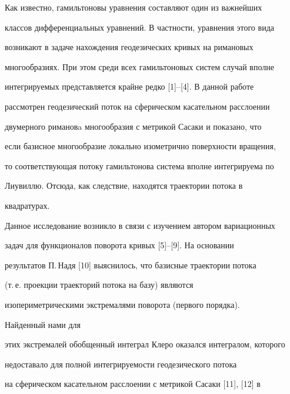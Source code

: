 




\maketitle 


\label{begin} 


 


Как известно, гамильтоновы уравнения составляют один из важнейших 


классов дифференциальных уравнений. В частности, уравнения этого вида 


возникают в задаче нахождения геодезических кривых на римановых 


многообразиях. При этом среди всех гамильтоновых систем случай вполне 


интегрируемых представляется крайне редко [1]--[4]. В данной работе 


рассмотрен геодезический поток на сферическом касательном расслоении 


двумерного римановa многообразия с метрикой Сасаки и показано, что 


если базисное многообразие локально изометрично поверхности вращения, 


то соответствующая потоку гамильтонова система вполне интегрируема по 


Лиувиллю. Отсюда, как следствие, находятся траектории потока в 


квадратурах. 


 


Данное исследование возникло в связи с изучением автором вариационных 


задач для функционалов поворота кривых [5]--[9]. На основании 


результатов П.\,Надя [10] выяснилось, что базисные траектории потока 


(т.\,е. проекции траекторий потока на базу) являются 


изопериметрическими экстремалями поворота (первого порядка).


Найденный нами для 


этих экстремалей обобщенный интеграл Клеро оказался интегралом, которого


недоставало для полной интегрируемости геодезического потока 


на сферическом касательном расслоении с метрикой Сасаки [11], [12] в 



